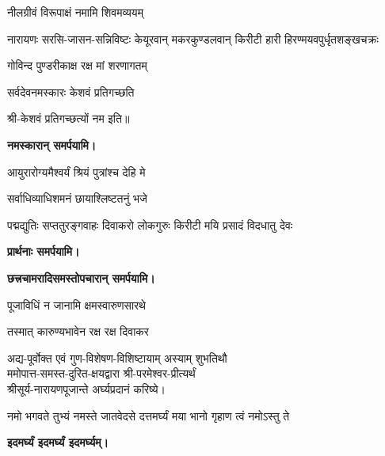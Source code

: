 \begin{center}

{नीलग्रीवं विरूपाक्षं नमामि शिवमव्ययम्}

{नारायणः सरसि-जासन-सन्निविष्टः}
{केयूरवान् मकरकुण्डलवान् किरीटी}
{हारी हिरण्मयवपुर्धृतशङ्खचक्रः}

{गोविन्द पुण्डरीकाक्ष रक्ष मां शरणागतम्}

{सर्वदेवनमस्कारः केशवं प्रतिगच्छति}

श्री-केशवं प्रतिगच्छत्यों नम इति॥

\textbf{\devAya{} नमस्कारान् समर्पयामि।}



{आयुरारोग्यमैश्वर्यं श्रियं पुत्रांश्च देहि मे}

{सर्वाधिव्याधिशमनं छायाश्लिष्टतनुं भजे}

{पद्मद्युतिः सप्ततुरङ्गवाहः}
{दिवाकरो लोकगुरुः किरीटी}
{मयि प्रसादं विदधातु देवः}


\textbf{प्रार्थनाः समर्पयामि।}

\textbf{\devAya{} छत्त्रचामरादिसमस्तोपचारान् समर्पयामि।}

{पूजाविधिं न जानामि क्षमस्वारुणसारथे}

{तस्मात् कारुण्यभावेन रक्ष रक्ष दिवाकर}

\resetShloka

\shuklambaradharam

अद्य-पूर्वोक्त एवं गुण-विशेषण-विशिष्टायाम् अस्याम् \textbf{\tithau{}} शुभतिथौ\\ 
ममोपात्त-समस्त-दुरित-क्षयद्वारा श्री-परमेश्वर-प्रीत्यर्थं\\
\prityartham{} श्रीसूर्य-नारायणपूजान्ते अर्घ्यप्रदानं करिष्ये।

\twolineshloka
{नमो भगवते तुभ्यं नमस्ते जातवेदसे}
{दत्तमर्घ्यं मया भानो गृहाण त्वं नमोऽस्तु ते}

\textbf{\devAya{} इदमर्घ्यं इदमर्घ्यं इदमर्घ्यम्।}


\end{center}
